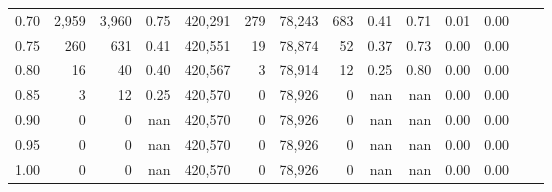 \begin{tabular}{rrrrrrrrrrrrrr}
0.70 &    2,959 &   3,960 &    0.75 &  420,291 &      279 &  78,243 &     683 &  0.41 &  0.71 &  0.01 &      0.00 \\
0.75 &      260 &     631 &    0.41 &  420,551 &       19 &  78,874 &      52 &  0.37 &  0.73 &  0.00 &      0.00 \\
0.80 &       16 &      40 &    0.40 &  420,567 &        3 &  78,914 &      12 &  0.25 &  0.80 &  0.00 &      0.00 \\
0.85 &        3 &      12 &    0.25 &  420,570 &        0 &  78,926 &       0 &   nan &   nan &  0.00 &      0.00 \\
0.90 &        0 &       0 &     nan &  420,570 &        0 &  78,926 &       0 &   nan &   nan &  0.00 &      0.00 \\
0.95 &        0 &       0 &     nan &  420,570 &        0 &  78,926 &       0 &   nan &   nan &  0.00 &      0.00 \\
1.00 &        0 &       0 &     nan &  420,570 &        0 &  78,926 &       0 &   nan &   nan &  0.00 &      0.00 \\
\bottomrule
\end{tabular}
